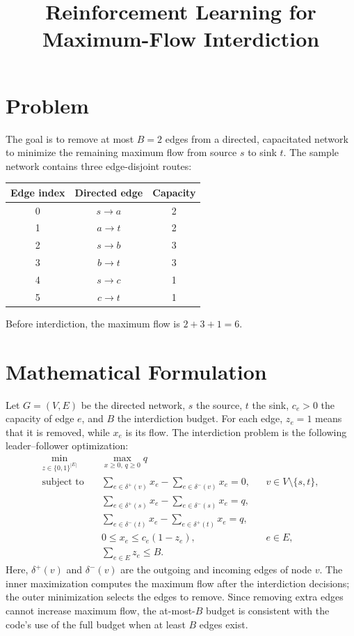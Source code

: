 \documentclass[11pt]{article}
\title{Reinforcement Learning for Maximum-Flow Interdiction}
\author{}
\date{}
\begin{document}
\maketitle

\section{Problem}
The goal is to remove at most \(B=2\) edges from a directed, capacitated
network to minimize the remaining maximum flow from source \(s\) to sink \(t\).
The sample network contains three edge-disjoint routes:

\begin{center}
\begin{tabular}{c|c|c}
Edge index & Directed edge & Capacity \\
\hline
0 & \(s \to a\) & 2 \\
1 & \(a \to t\) & 2 \\
2 & \(s \to b\) & 3 \\
3 & \(b \to t\) & 3 \\
4 & \(s \to c\) & 1 \\
5 & \(c \to t\) & 1
\end{tabular}
\end{center}

Before interdiction, the maximum flow is \(2+3+1=6\).

\section{Mathematical Formulation}
Let \(G=(V,E)\) be the directed network, \(s\) the source, \(t\) the sink,
\(c_e>0\) the capacity of edge \(e\), and \(B\) the interdiction budget.
For each edge, \(z_e=1\) means that it is removed, while \(x_e\) is its
flow. The interdiction problem is the following leader--follower optimization:
\[
\begin{aligned}
\min_{z\in\{0,1\}^{|E|}}\quad
    & \max_{x\geq 0,\,q\geq 0} q \\
\text{subject to}\quad
    & \sum_{e\in\delta^+(v)}x_e-\sum_{e\in\delta^-(v)}x_e=0,
      && v\in V\setminus\{s,t\},\\
    & \sum_{e\in\delta^+(s)}x_e-\sum_{e\in\delta^-(s)}x_e=q,\\
    & \sum_{e\in\delta^-(t)}x_e-\sum_{e\in\delta^+(t)}x_e=q,\\
    & 0\leq x_e\leq c_e(1-z_e),
      && e\in E,\\
    & \sum_{e\in E} z_e\leq B.
\end{aligned}
\]
Here, \(\delta^+(v)\) and \(\delta^-(v)\) are the outgoing and incoming
edges of node \(v\). The inner maximization computes the maximum flow after
the interdiction decisions; the outer minimization selects the edges to
remove. Since removing extra edges cannot increase maximum flow, the
at-most-\(B\) budget is consistent with the code's use of the full budget
when at least \(B\) edges exist.
\end{document}
